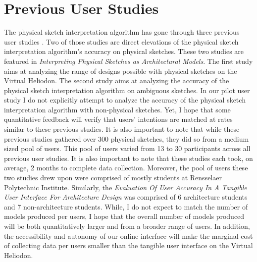 \section{Previous User Studies}
	The physical sketch interpretation algorithm has gone through three previous user studies \cite{cutler2010interpreting,nasman2013evaluation}.
	Two of those studies are direct elevations of the physical sketch interpretation algorithm's accuracy on physical sketches.
	These two studies are featured in \textit{Interpreting Physical Sketches as Architectural Models}\cite{cutler2010interpreting}.
	The first study aims at analyzing the range of designs possible with physical sketches on the Virtual Heliodon.
	The second study aims at analyzing the accuracy of the physical sketch interpretation algorithm on ambiguous sketches.
	In our pilot user study I do not explicitly attempt to analyze the accuracy of the physical sketch interpretation algorithm with non-physical sketches. Yet, I hope that some quantitative feedback will verify that users' intentions are matched at rates similar to these previous studies.
	It is also important to note that while these previous studies gathered over 300 physical sketches, they did so from a medium sized pool of users.
	This pool of users varied from 13 to 30 participants across all previous user studies.
	It is also important to note that these studies each took, on average, 2 months to complete data collection. Moreover, the pool of users these two studies drew upon were comprised of mostly students at Rensselaer Polytechnic Institute.
	Similarly, the \textit{Evaluation Of User Accuracy In A Tangible User Interface For Architecture Design} was comprised of 6 architecture students and 7 non-architecture students. While, I do not expect to match the number of models produced per users, I hope that the overall number of models produced will be both quantitatively larger and from a broader range of users.
	In addition, the accessibility and autonomy of our online interface will make the marginal cost of collecting data per users smaller than the tangible user interface on the Virtual Heliodon.

